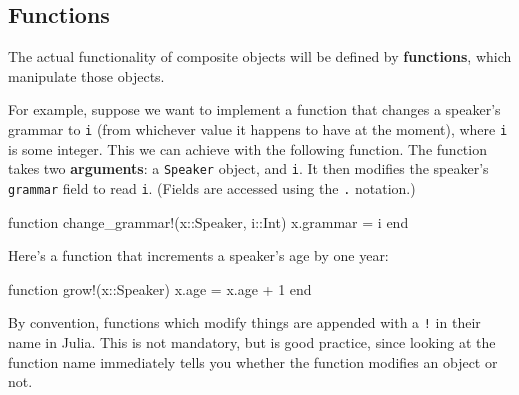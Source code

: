 \documentclass[
  letterpaper,
  DIV=11,
  numbers=noendperiod]{scrartcl}
\newenvironment{Shaded}{\begin{snugshade}}{\end{snugshade}}
\newcommand{\DataTypeTok}[1]{\textcolor[rgb]{0.68,0.00,0.00}{#1}}
\newcommand{\FloatTok}[1]{\textcolor[rgb]{0.68,0.00,0.00}{#1}}
\newcommand{\FunctionTok}[1]{\textcolor[rgb]{0.28,0.35,0.67}{#1}}
\newcommand{\KeywordTok}[1]{\textcolor[rgb]{0.00,0.23,0.31}{#1}}
\newcommand{\NormalTok}[1]{\textcolor[rgb]{0.00,0.23,0.31}{#1}}
\newcommand{\OperatorTok}[1]{\textcolor[rgb]{0.37,0.37,0.37}{#1}}
\begin{document}
\subsection{Functions}\label{functions-1}

The actual functionality of composite objects will be defined by
\textbf{functions}, which manipulate those objects.

For example, suppose we want to implement a function that changes a
speaker's grammar to \texttt{i} (from whichever value it happens to have
at the moment), where \texttt{i} is some integer. This we can achieve
with the following function. The function takes two \textbf{arguments}:
a \texttt{Speaker} object, and \texttt{i}. It then modifies the
speaker's \texttt{grammar} field to read \texttt{i}. (Fields are
accessed using the \texttt{.} notation.)

\begin{Shaded}
\begin{Highlighting}[]
\KeywordTok{function} \FunctionTok{change\_grammar!}\NormalTok{(x}\OperatorTok{::}\DataTypeTok{Speaker}\NormalTok{, i}\OperatorTok{::}\DataTypeTok{Int}\NormalTok{)}
\NormalTok{  x.grammar }\OperatorTok{=}\NormalTok{ i}
\KeywordTok{end}
\end{Highlighting}
\end{Shaded}

Here's a function that increments a speaker's age by one year:

\begin{Shaded}
\begin{Highlighting}[]
\KeywordTok{function} \FunctionTok{grow!}\NormalTok{(x}\OperatorTok{::}\DataTypeTok{Speaker}\NormalTok{)}
\NormalTok{  x.age }\OperatorTok{=}\NormalTok{ x.age }\OperatorTok{+} \FloatTok{1}
\KeywordTok{end}
\end{Highlighting}
\end{Shaded}

\begin{tcolorbox}[enhanced jigsaw, left=2mm, colbacktitle=quarto-callout-note-color!10!white, titlerule=0mm, breakable, arc=.35mm, opacitybacktitle=0.6, coltitle=black, opacityback=0, toprule=.15mm, bottomrule=.15mm, colframe=quarto-callout-note-color-frame, bottomtitle=1mm, rightrule=.15mm, leftrule=.75mm, colback=white, toptitle=1mm, title=\textcolor{quarto-callout-note-color}{\faInfo}\hspace{0.5em}{Note}]

By convention, functions which modify things are appended with a
\texttt{!} in their name in Julia. This is not mandatory, but is good
practice, since looking at the function name immediately tells you
whether the function modifies an object or not.

\end{tcolorbox}
\end{document}
